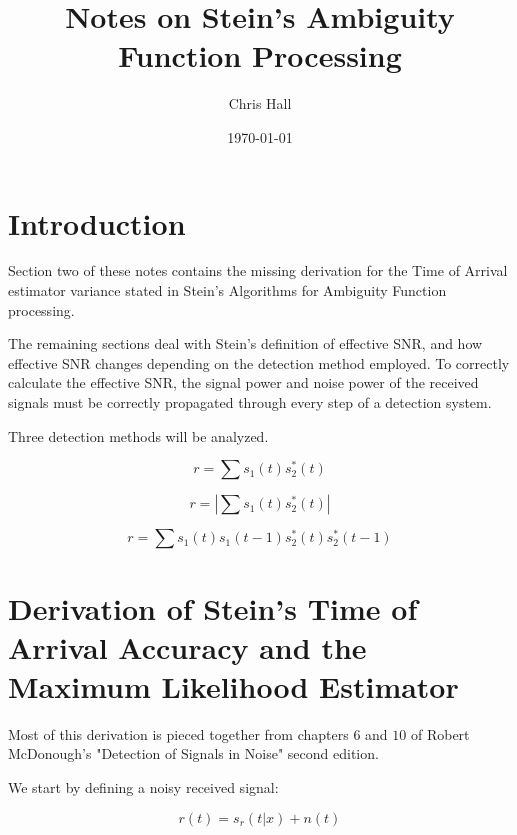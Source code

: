 \documentclass[11pt]{article}
\title{ Notes on Stein's Ambiguity Function Processing}
\author{ Chris Hall }
\date{\today}
\begin{document}
\maketitle  





\section{Introduction}

Section two of these notes contains the missing derivation for the Time of Arrival estimator variance stated in Stein's Algorithms for Ambiguity Function processing.

The remaining sections deal with Stein's definition of effective SNR, and how effective SNR changes depending on the detection method employed.
To correctly calculate the effective SNR, the signal power and noise power of the received signals must be correctly propagated through every step of a detection system.

Three detection methods will be analyzed.

\begin{equation}
r = \sum s_1(t) s_2^*(t)
\end{equation}

\begin{equation}
r = |\sum s_1(t) s_2^*(t)|
\end{equation}

\begin{equation}
r = \sum s_1(t)s_1(t-1) s_2^*(t) s_2^*(t-1)
\end{equation}


\section{Derivation of Stein's Time of Arrival Accuracy and the Maximum Likelihood Estimator}

Most of this derivation is pieced together from chapters $6$ and $10$ of Robert McDonough's "Detection of Signals in Noise" second edition.

We start by defining a noisy received signal:


\begin{equation}
r(t) = s_r(t|x) + n(t)
\end{equation}
\end{document}
